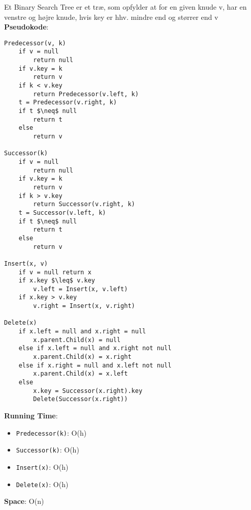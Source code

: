 Et Binary Search Tree er et træ, som opfylder at for en given knude v, har en venstre og højre knude, hvis key er hhv. mindre end og størrer end v\\
\textbf{Pseudokode}:
\begin{lstlisting}[frame=single, mathescape=true]
Predecessor(v, k)
	if v = null
		return null
	if v.key = k
		return v
	if k < v.key
		return Predecessor(v.left, k)
	t = Predecessor(v.right, k)
	if t $\neq$ null
		return t
	else
		return v

Successor(k)
	if v = null
		return null
	if v.key = k
		return v
	if k > v.key
		return Successor(v.right, k)
	t = Successor(v.left, k)
	if t $\neq$ null
		return t
	else
		return v

Insert(x, v)
	if v = null return x
	if x.key $\leq$ v.key
		v.left = Insert(x, v.left)
	if x.key > v.key
		v.right = Insert(x, v.right)

Delete(x)
	if x.left = null and x.right = null
		x.parent.Child(x) = null
	else if x.left = null and x.right not null
		x.parent.Child(x) = x.right
	else if x.right = null and x.left not null
		x.parent.Child(x) = x.left
	else
		x.key = Successor(x.right).key
		Delete(Successor(x.right))
\end{lstlisting}
\newpage
\noindent\textbf{Running Time}:
\begin{itemize}
	\item \texttt{Predecessor(k)}: O(h)
	\item \texttt{Successor(k)}: O(h)
	\item \texttt{Insert(x)}: O(h)
	\item \texttt{Delete(x)}: O(h)
\end{itemize}
\textbf{Space}: O(n)